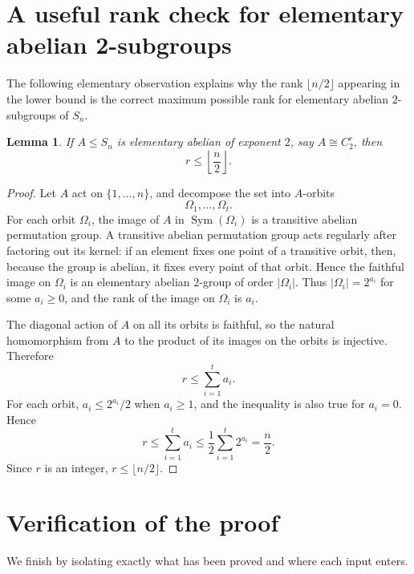 \documentclass[a4paper,11pt]{amsart}
\newtheorem{lemma}[theorem]{Lemma}
\theoremstyle{remark}
\newcommand{\Sym}{\operatorname{Sym}}
\begin{document}
\section{A useful rank check for elementary abelian 2-subgroups}

The following elementary observation explains why the rank \(\lfloor n/2\rfloor\) appearing in the
lower bound is the correct maximum possible rank for elementary abelian \(2\)-subgroups of \(S_n\).

\begin{lemma}\label{lem:rank-bound}
If \(A\leq S_n\) is elementary abelian of exponent \(2\), say \(A\cong C_2^r\), then
\[
        r\leq \left\lfloor\frac n2\right\rfloor.
\]
\end{lemma}

\begin{proof}
Let \(A\) act on \(\{1,
\ldots,n\}\), and decompose the set into \(A\)-orbits
\[
        \Omega_1,\ldots,\Omega_t.
\]
For each orbit \(\Omega_i\), the image of \(A\) in \(\Sym(\Omega_i)\) is a transitive abelian
permutation group. A transitive abelian permutation group acts regularly after factoring out its
kernel: if an element fixes one point of a transitive orbit, then, because the group is abelian, it
fixes every point of that orbit. Hence the faithful image on \(\Omega_i\) is an elementary abelian
2-group of order \(|\Omega_i|\). Thus \(|\Omega_i|=2^{a_i}\) for some \(a_i\geq 0\), and the rank of
the image on \(\Omega_i\) is \(a_i\).

The diagonal action of \(A\) on all its orbits is faithful, so the natural homomorphism from \(A\)
to the product of its images on the orbits is injective. Therefore
\[
        r\leq \sum_{i=1}^t a_i.
\]
For each orbit, \(a_i\leq 2^{a_i}/2\) when \(a_i\geq 1\), and the inequality is also true for
\(a_i=0\). Hence
\[
        r\leq \sum_{i=1}^t a_i
        \leq
        \frac12\sum_{i=1}^t 2^{a_i}
        =\frac n2.
\]
Since \(r\) is an integer, \(r\leq\lfloor n/2\rfloor\).
\end{proof}

\section{Verification of the proof}

We finish by isolating exactly what has been proved and where each input enters.
\end{document}
